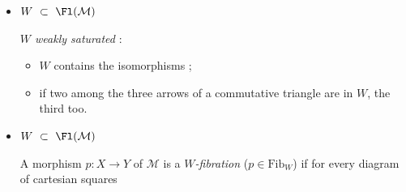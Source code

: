 \begin{itemize}
\item $W \ \subset\ \Fl(\mathcal{M})$

\textit{$W$ weakly saturated} :
\begin{itemize}
\item[a)] $W$ contains the isomorphisms ;
\item[b)] if two among the three arrows of a commutative triangle are in $W$, the third too.
\end{itemize}

\item $W \ \subset\ \Fl(\mathcal{M})$

A morphism $p : X \longrightarrow Y$ of $\mathcal{M}$ is a \textit{$W$-fibration} ($p \in \mathrm{Fib}_W$) if for every diagram of cartesian squares
\end{itemize}